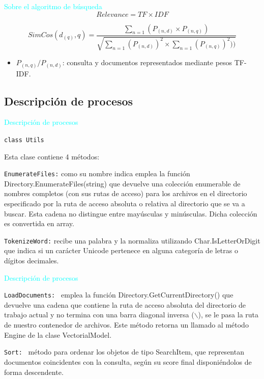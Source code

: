 \documentclass[a4paper, 12pt]{beamer}
\begin{document}
\begin{frame}{\textcolor{cyan}{Sobre el algoritmo de búsqueda}}
    \begin{equation}
        Relevance=TF\times IDF
    \end{equation}

    
    \begin{equation}
        SimCos(d_{(q)}, q) = \frac{\sum_{n=1} (P_{(n, d)} \times P_{(n, q)})}{\sqrt{\sum_{n = 1} (P_{(n, d)})^{2} \times \sum_{n = 1} (P_{(n, q)})^{2} ))}}
    \end{equation}
    \begin{itemize}
        \item $P_{(n,q)} / P_{(n,d)}$: consulta y documentos representados mediante pesos TF-IDF.
    \end{itemize}
\end{frame}

\subsection{Descripción de procesos}

\begin{frame}{\textcolor{cyan}{Descripción de procesos}}
    
    {\tt class Utils}


    Esta clase contiene 4 métodos:


        {\small {\tt EnumerateFiles:} como su nombre indica emplea la función Directory.EnumerateFiles(string) que 
        devuelve una colección enumerable de nombres completos (con sus rutas de acceso) para 
        los archivos en el directorio especificado por la ruta de acceso absoluta o relativa 
        al directorio que se va a buscar. Esta cadena no distingue entre mayúsculas y minúsculas.
        Dicha colección es convertida en array.}


        {\small {\tt TokenizeWord:} recibe una palabra y la normaliza utilizando
        Char.IsLetterOrDigit que indica si un carácter Unicode pertenece en alguna
        categoría de letras o dígitos decimales.}
\end{frame}

\begin{frame}{\textcolor{cyan}{Descripción de procesos}}
    
    {\small {\tt LoadDocuments: } emplea la función Directory.GetCurrentDirectory() que
    devuelve una cadena que contiene la ruta de acceso absoluta del directorio
    de trabajo actual y no termina con una barra diagonal inversa ($\backslash$), se le pasa
    la ruta de nuestro contenedor de archivos. Este método retorna un llamado
    al método Engine de la clase VectorialModel.}
    

    {\small {\tt Sort: } método para ordenar los objetos de tipo SearchItem, que representan
        documentos coincidentes con la consulta, según su score final
        disponiéndolos de forma descendente.}
\end{frame}
\end{document}
